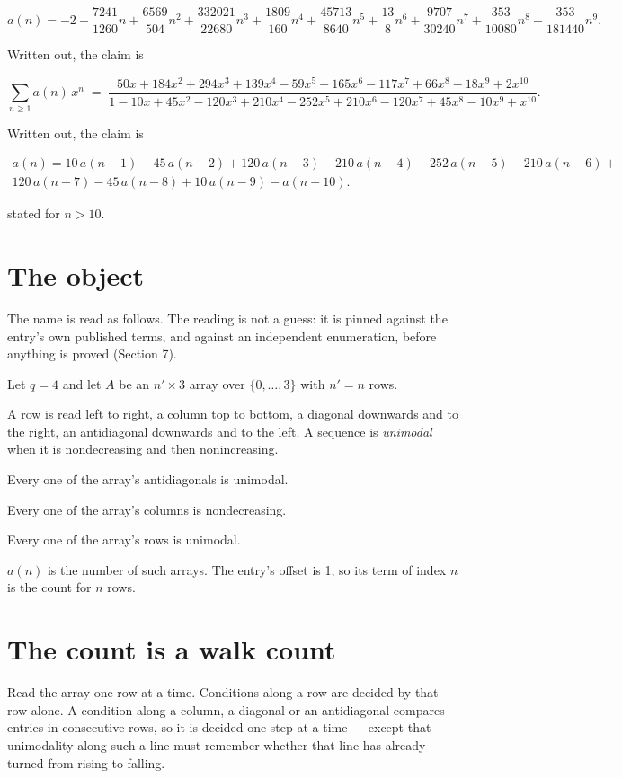 \documentclass[11pt]{article}
\theoremstyle{definition}
\begin{document}
\[a(n) = -2 + \frac{7241}{1260}n + \frac{6569}{504}n^{2} + \frac{332021}{22680}n^{3} + \frac{1809}{160}n^{4} + \frac{45713}{8640}n^{5} + \frac{13}{8}n^{6} + \frac{9707}{30240}n^{7} + \frac{353}{10080}n^{8} + \frac{353}{181440}n^{9}.\]

Written out, the claim is

\[\sum_{n \ge 1} a(n)\,x^n \;=\; \frac{50x + 184x^{2} + 294x^{3} + 139x^{4} - 59x^{5} + 165x^{6} - 117x^{7} + 66x^{8} - 18x^{9} + 2x^{10}}{1 - 10x + 45x^{2} - 120x^{3} + 210x^{4} - 252x^{5} + 210x^{6} - 120x^{7} + 45x^{8} - 10x^{9} + x^{10}}.\]

Written out, the claim is

\begin{multline*} a(n) = 10\,a(n-1) - 45\,a(n-2) + 120\,a(n-3) - 210\,a(n-4) + 252\,a(n-5) - 210\,a(n-6) + \\ 120\,a(n-7) - 45\,a(n-8) + 10\,a(n-9) - a(n-10). \end{multline*}

stated for $n > 10$.

\section{The object}

The name is read as follows. The reading is not a guess: it is pinned against the entry's own published terms, and against an independent enumeration, before anything is proved (Section 7).

Let $q = 4$ and let $A$ be an $n' \times 3$ array over $\{0,\dots,3\}$ with $n' = n$ rows.

A row is read left to right, a column top to bottom, a diagonal downwards and to the right, an antidiagonal downwards and to the left. A sequence is {\itshape unimodal} when it is nondecreasing and then nonincreasing.

Every one of the array's antidiagonals is unimodal.

Every one of the array's columns is nondecreasing.

Every one of the array's rows is unimodal.

$a(n)$ is the number of such arrays. The entry's offset is 1, so its term of index $n$ is the count for $n$ rows.

\section{The count is a walk count}

Read the array one row at a time. Conditions along a row are decided by that row alone. A condition along a column, a diagonal or an antidiagonal compares entries in consecutive rows, so it is decided one step at a time --- except that unimodality along such a line must remember whether that line has already turned from rising to falling.
\end{document}
